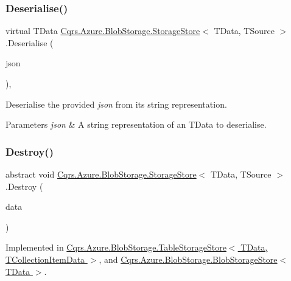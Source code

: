 \subsubsection{\texorpdfstring{Deserialise()}{Deserialise()}\hspace{0.1cm}{\footnotesize\ttfamily [2/2]}}
{\footnotesize\ttfamily virtual T\+Data \hyperlink{classCqrs_1_1Azure_1_1BlobStorage_1_1StorageStore}{Cqrs.\+Azure.\+Blob\+Storage.\+Storage\+Store}$<$ T\+Data, T\+Source $>$.Deserialise (\begin{DoxyParamCaption}\item[{string}]{json }\end{DoxyParamCaption})\hspace{0.3cm}{\ttfamily [protected]}, {\ttfamily [virtual]}}



Deserialise the provided {\itshape json}  from its string representation. 


\begin{DoxyParams}{Parameters}
{\em json} & A string representation of an T\+Data to deserialise.\\
\hline
\end{DoxyParams}
\mbox{\label{classCqrs_1_1Azure_1_1BlobStorage_1_1StorageStore_a9879b4ab18c2a33d7e20bc0b3a734195_a9879b4ab18c2a33d7e20bc0b3a734195}} 
\subsubsection{\texorpdfstring{Destroy()}{Destroy()}}
{\footnotesize\ttfamily abstract void \hyperlink{classCqrs_1_1Azure_1_1BlobStorage_1_1StorageStore}{Cqrs.\+Azure.\+Blob\+Storage.\+Storage\+Store}$<$ T\+Data, T\+Source $>$.Destroy (\begin{DoxyParamCaption}\item[{T\+Data}]{data }\end{DoxyParamCaption})\hspace{0.3cm}{\ttfamily [pure virtual]}}



Implemented in \hyperlink{classCqrs_1_1Azure_1_1BlobStorage_1_1TableStorageStore_a1ad02e710a3fe1d794d99db332c351dc_a1ad02e710a3fe1d794d99db332c351dc}{Cqrs.\+Azure.\+Blob\+Storage.\+Table\+Storage\+Store$<$ T\+Data, T\+Collection\+Item\+Data $>$}, and \hyperlink{classCqrs_1_1Azure_1_1BlobStorage_1_1BlobStorageStore_a7e4870567b393327563d131cb25151e0_a7e4870567b393327563d131cb25151e0}{Cqrs.\+Azure.\+Blob\+Storage.\+Blob\+Storage\+Store$<$ T\+Data $>$}.


